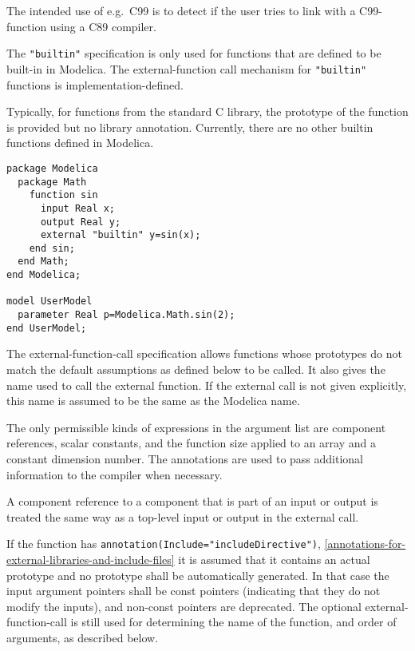 \begin{nonnormative}
The intended use of e.g.\ C99 is to detect if the user tries to link with a C99-function using a C89 compiler.
\end{nonnormative}

The \lstinline!"builtin"! specification is only used for functions that are defined
to be built-in in Modelica. The external-function call mechanism for
\lstinline!"builtin"! functions is implementation-defined.

\begin{nonnormative}
Typically, for functions from the standard C library, the prototype of the function is provided but no library annotation. Currently, there are
no other builtin functions defined in Modelica.
\end{nonnormative}

\begin{example}
\begin{lstlisting}[language=modelica]
package Modelica
  package Math
    function sin
      input Real x;
      output Real y;
      external "builtin" y=sin(x);
    end sin;
  end Math;
end Modelica;

model UserModel
  parameter Real p=Modelica.Math.sin(2);
end UserModel;
\end{lstlisting}
\end{example}

The external-function-call specification allows functions whose
prototypes do not match the default assumptions as defined below to be
called. It also gives the name used to call the external function. If
the external call is not given explicitly, this name is assumed to be
the same as the Modelica name.

The only permissible kinds of expressions in the argument list are
component references, scalar constants, and the function size applied to
an array and a constant dimension number. The annotations are used to
pass additional information to the compiler when necessary.

A component reference to a component that is part of an input or output
is treated the same way as a top-level input or output in the external
call.

If the function has \lstinline!annotation(Include="includeDirective")!, \cref{annotations-for-external-libraries-and-include-files}
it is assumed that it contains an actual prototype and no prototype shall be automatically generated.
In that case the input argument pointers shall be const pointers (indicating that they do not modify the inputs),
and non-const pointers are deprecated.
The optional external-function-call is still used for determining the name of the function, and order of arguments, as described below.

